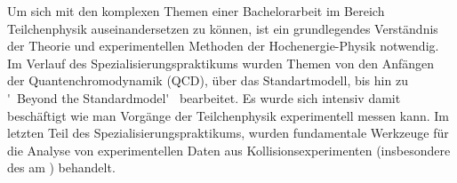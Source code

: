 Um sich mit den komplexen Themen einer Bachelorarbeit im Bereich Teilchenphysik auseinandersetzen zu können, ist ein grundlegendes Verständnis der Theorie und experimentellen Methoden der Hochenergie-Physik notwendig. Im Verlauf des Spezialisierungspraktikums wurden Themen von den Anfängen der Quantenchromodynamik (QCD), über das Standartmodell, bis hin zu \'~Beyond the Standardmodel\'~ bearbeitet. Es wurde sich intensiv damit beschäftigt wie man Vorgänge der Teilchenphysik experimentell messen kann. Im letzten Teil des Spezialisierungspraktikums, wurden fundamentale Werkzeuge für die Analyse von experimentellen Daten aus Kollisionsexperimenten (insbesondere des \lhc am \cern) behandelt.  